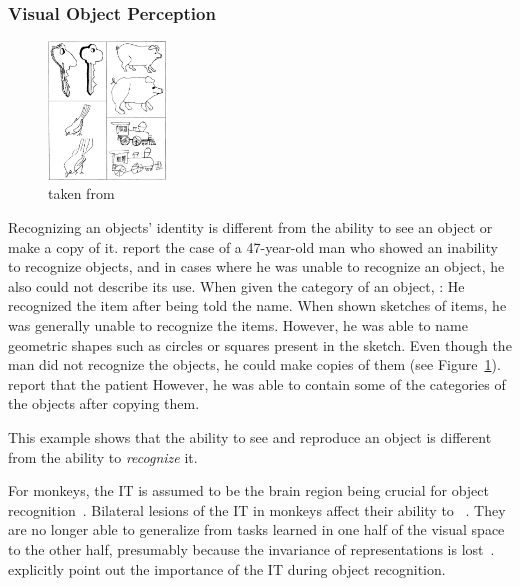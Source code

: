\subsubsection{Visual Object Perception}\label{subsec:visual-object-perception}

\begin{figure}
    \begin{center}
        \includegraphics[width=0.28\textwidth]{images/rubens_sketches.jpg}
    \end{center}
    \caption[Copies of line drawings]{ taken from \citet{rubens1971associative}}
    \label{fig:copies_line_drawings}
\end{figure}
Recognizing an objects' identity is different from the ability to see an object or make a copy of it.
\citet{rubens1971associative} report the case of a 47-year-old man who showed an inability to recognize objects, and in cases where he was unable to recognize an object, he also could not describe its use.
When given the category of an object, :
He recognized the item after being told the name.
When shown sketches of items, he was generally unable to recognize the items.
However, he was able to name geometric shapes such as circles or squares present in the sketch.
Even though the man did not recognize the objects, he could make copies of them (see Figure~\ref{fig:copies_line_drawings}).
\citet{rubens1971associative} report that the patient 
However, he was able to contain some of the categories of the objects after copying them.

This example shows that the ability to see and reproduce an object is different from the ability to \textit{recognize} it.

For monkeys, the \ac{IT} is assumed to be the brain region being crucial for object recognition~\citep[pp. 1070, 1071]{squire2012fundamental}.
Bilateral lesions of the \ac{IT} in monkeys affect their ability to ~\citep[p. 1070]{squire2012fundamental}.
They are no longer able to generalize from tasks learned in one half of the visual space to the other half, presumably because the invariance of representations is lost~\citep[p. 1070]{squire2012fundamental}.
\citet[p. 1071]{squire2012fundamental} explicitly point out the importance of the \ac{IT} during object recognition.

